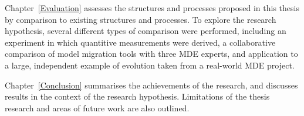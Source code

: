 Chapter~\ref{Evaluation} assesses the structures and processes proposed in this thesis by comparison to existing structures and processes. To explore the research hypothesis, several different types of comparison were performed, including an experiment in which quantitive measurements were derived, a collaborative comparison of model migration tools with three MDE experts, and application to a large, independent example of evolution taken from a real-world MDE project.

Chapter~\ref{Conclusion} summarises the achievements of the research, and discusses results in the context of the research hypothesis. Limitations of the thesis research and areas of future work are also outlined.